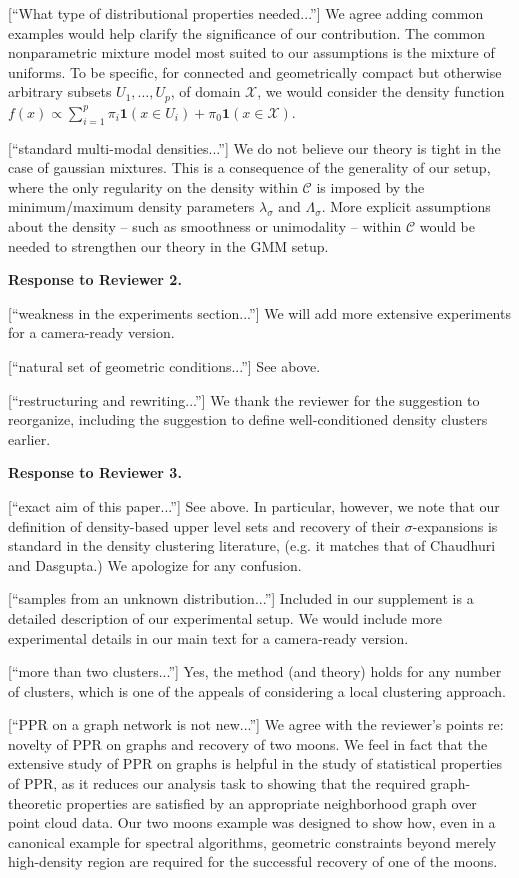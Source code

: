 \documentclass{article}
\newcommand{\1}{\mathbb{I}}
\theoremstyle{alden}
\theoremstyle{aldenthm}
\theoremstyle{definition}
\theoremstyle{remark}
\begin{document}
[``What type of distributional properties needed...''] We agree adding common examples would help clarify the significance of our contribution. The common nonparametric mixture model most suited to our assumptions is the mixture of uniforms. To be specific, for connected and geometrically compact but otherwise arbitrary subsets $U_1, \ldots, U_p$,  of domain $\mathcal{X}$, we would consider the density function $f(x) \propto \sum_{i = 1}^{p} \pi_i \mathbf{1}(x \in U_i) + \pi_0 \mathbf{1}(x \in \mathcal{X})$. 

[``standard multi-modal densities...''] We do not believe our theory is tight in the case of gaussian mixtures. This is a consequence of the generality of our setup, where the only regularity on the density within $\mathcal{C}$ is imposed by the minimum/maximum density parameters $\lambda_{\sigma}$ and $\Lambda_{\sigma}$. More explicit assumptions about the density -- such as smoothness or unimodality -- within $\mathcal{C}$ would be needed to strengthen our theory in the GMM setup. 

\textbf{Response to Reviewer 2.}

[``weakness in the experiments section...''] We will add more extensive experiments for a camera-ready version.

[``natural set of geometric conditions...''] See above.

[``restructuring and rewriting...''] We thank the reviewer for the suggestion to reorganize, including the suggestion to define well-conditioned density clusters earlier.

\textbf{Response to Reviewer 3. }

[``exact aim of this paper...''] See above. In particular, however, we note that our definition of density-based upper level sets and recovery of their $\sigma$-expansions is standard in the density clustering literature, (e.g. it matches that of Chaudhuri and Dasgupta.) We apologize for any confusion.

[``samples from an unknown distribution...''] Included in our supplement is a detailed description of our experimental setup. We would include more experimental details in our main text for a camera-ready version.

[``more than two clusters...''] Yes, the method (and theory) holds for any number of clusters, which is one of the appeals of considering a local clustering approach.

[``PPR on a graph network is not new...''] We agree with the reviewer's points re: novelty of PPR on graphs and recovery of two moons. We feel in fact that the extensive study of PPR on graphs is helpful in the study of statistical properties of PPR, as it reduces our analysis task to showing that the required graph-theoretic properties are satisfied by an appropriate neighborhood graph over point cloud data. Our two moons example was designed to show how, even in a canonical example for spectral algorithms, geometric constraints beyond merely high-density region are required for the successful recovery of one of the moons.


	
\end{document}

